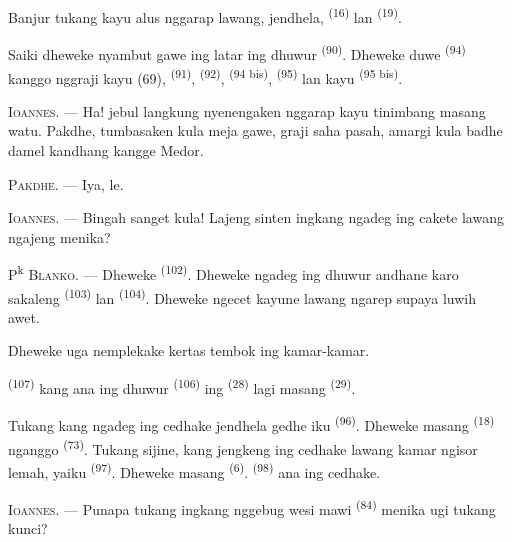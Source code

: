 Banjur tukang kayu alus nggarap lawang, jendhela, 
\textsuperscript{(16)} lan  \textsuperscript{(19)}.

Saiki dheweke nyambut gawe ing latar ing dhuwur 
\textsuperscript{(90)}. Dheweke duwe 
\textsuperscript{(94)} kanggo nggraji kayu (69), 
\textsuperscript{(91)},  \textsuperscript{(92)},
 \textsuperscript{(94 bis)}, 
\textsuperscript{(95)} lan  kayu \textsuperscript{(95 bis)}.

\textsc{Ioannes}. --- Ha! jebul langkung nyenengaken nggarap kayu
tinimbang masang watu. Pakdhe, tumbasaken kula meja gawe, graji saha
pasah, amargi kula badhe damel kandhang kangge Medor.

\textsc{Pakdhe}. --- Iya, le.

\textsc{Ioannes}. --- Bingah sanget kula! Lajeng sinten ingkang ngadeg
ing cakete lawang ngajeng menika?

\VUsaut{3.0mm}
\VUsaut{3.0mm}

P\textsuperscript{k} \textsc{Blanko}. --- Dheweke 
\textsuperscript{(102)}. Dheweke ngadeg ing dhuwur andhane karo
sakaleng  \textsuperscript{(103)} lan 
\textsuperscript{(104)}. Dheweke ngecet kayune lawang ngarep supaya
luwih awet.

Dheweke uga nemplekake kertas tembok ing kamar-kamar.

 \textsuperscript{(107)} kang ana ing dhuwur
 \textsuperscript{(106)} ing 
\textsuperscript{(28)} lagi masang  \textsuperscript{(29)}.

Tukang kang ngadeg ing cedhake jendhela gedhe iku 
\textsuperscript{(96)}. Dheweke masang 
\textsuperscript{(18)} nganggo  \textsuperscript{(73)}.
Tukang sijine, kang jengkeng ing cedhake lawang kamar ngisor lemah,
yaiku  \textsuperscript{(97)}. Dheweke masang
 \textsuperscript{(6)}. 
\textsuperscript{(98)} ana ing cedhake.

\textsc{Ioannes}. --- Punapa tukang ingkang nggebug wesi mawi
 \textsuperscript{(84)} menika ugi tukang kunci?

